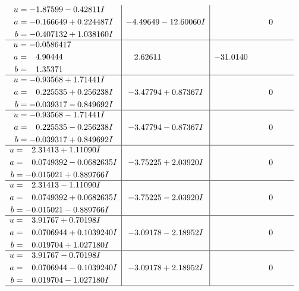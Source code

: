 \documentclass[1p]{elsarticle_modified}
\theoremstyle{definition}
\begin{document}
$$\begin{array}{c|c|c}
\begin{aligned}
u &= -1.87599 - 0.42811 I \\
a &= -0.166649 + 0.224487 I \\
b &= -0.407132 + 1.038160 I\end{aligned}
 & -4.49649 - 12.60060 I & \phantom{-0.000000 } 0 \\ \hline\begin{aligned}
u &= -0.0586417\phantom{ +0.000000I} \\
a &= \phantom{-}4.90444\phantom{ +0.000000I} \\
b &= \phantom{-}1.35371\phantom{ +0.000000I}\end{aligned}
 & \phantom{-}2.62611\phantom{ +0.000000I} & -31.0140\phantom{ +0.000000I} \\ \hline\begin{aligned}
u &= -0.93568 + 1.71441 I \\
a &= \phantom{-}0.225535 + 0.256238 I \\
b &= -0.039317 - 0.849692 I\end{aligned}
 & -3.47794 + 0.87367 I & \phantom{-0.000000 } 0 \\ \hline\begin{aligned}
u &= -0.93568 - 1.71441 I \\
a &= \phantom{-}0.225535 - 0.256238 I \\
b &= -0.039317 + 0.849692 I\end{aligned}
 & -3.47794 - 0.87367 I & \phantom{-0.000000 } 0 \\ \hline\begin{aligned}
u &= \phantom{-}2.31413 + 1.11090 I \\
a &= \phantom{-}0.0749392 - 0.0682635 I \\
b &= -0.015021 + 0.889766 I\end{aligned}
 & -3.75225 + 2.03920 I & \phantom{-0.000000 } 0 \\ \hline\begin{aligned}
u &= \phantom{-}2.31413 - 1.11090 I \\
a &= \phantom{-}0.0749392 + 0.0682635 I \\
b &= -0.015021 - 0.889766 I\end{aligned}
 & -3.75225 - 2.03920 I & \phantom{-0.000000 } 0 \\ \hline\begin{aligned}
u &= \phantom{-}3.91767 + 0.70198 I \\
a &= \phantom{-}0.0706944 + 0.1039240 I \\
b &= \phantom{-}0.019704 + 1.027180 I\end{aligned}
 & -3.09178 - 2.18952 I & \phantom{-0.000000 } 0 \\ \hline\begin{aligned}
u &= \phantom{-}3.91767 - 0.70198 I \\
a &= \phantom{-}0.0706944 - 0.1039240 I \\
b &= \phantom{-}0.019704 - 1.027180 I\end{aligned}
 & -3.09178 + 2.18952 I & \phantom{-0.000000 } 0\\
 \hline 
 \end{array}$$\newpage\newpage\renewcommand{\arraystretch}{1}
\end{document}
